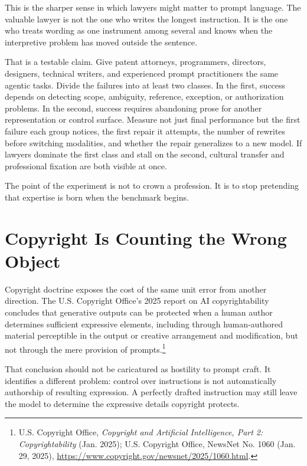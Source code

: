 \documentclass[11pt]{article}
\begin{document}
This is the sharper sense in which lawyers might matter to prompt language. The valuable lawyer is not the one who writes the longest instruction. It is the one who treats wording as one instrument among several and knows when the interpretive problem has moved outside the sentence.

That is a testable claim. Give patent attorneys, programmers, directors, designers, technical writers, and experienced prompt practitioners the same agentic tasks. Divide the failures into at least two classes. In the first, success depends on detecting scope, ambiguity, reference, exception, or authorization problems. In the second, success requires abandoning prose for another representation or control surface. Measure not just final performance but the first failure each group notices, the first repair it attempts, the number of rewrites before switching modalities, and whether the repair generalizes to a new model. If lawyers dominate the first class and stall on the second, cultural transfer and professional fixation are both visible at once.

The point of the experiment is not to crown a profession. It is to stop pretending that expertise is born when the benchmark begins.

\section{Copyright Is Counting the Wrong Object}

Copyright doctrine exposes the cost of the same unit error from another direction. The U.S. Copyright Office's 2025 report on AI copyrightability concludes that generative outputs can be protected when a human author determines sufficient expressive elements, including through human-authored material perceptible in the output or creative arrangement and modification, but not through the mere provision of prompts.\footnote{U.S. Copyright Office, \textit{Copyright and Artificial Intelligence, Part 2: Copyrightability} (Jan. 2025); U.S. Copyright Office, NewsNet No. 1060 (Jan. 29, 2025), \url{https://www.copyright.gov/newsnet/2025/1060.html}.}

That conclusion should not be caricatured as hostility to prompt craft. It identifies a different problem: control over instructions is not automatically authorship of resulting expression. A perfectly drafted instruction may still leave the model to determine the expressive details copyright protects.
\end{document}
